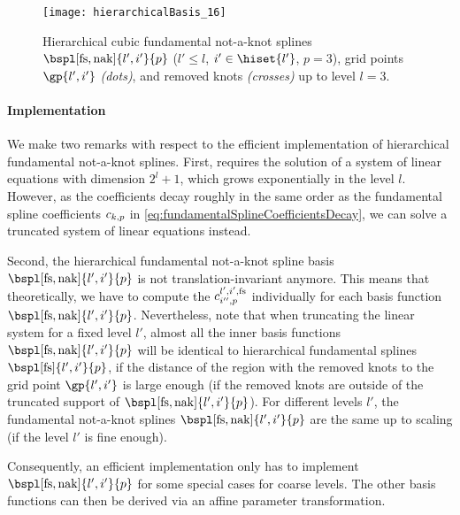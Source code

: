 \begin{SCfigure}
  \texttt{[image: hierarchicalBasis\_16]}%
  \caption[%
    Hierarchical fundamental not-a-knot splines%
  ]{%
    Hierarchical cubic fundamental not-a-knot splines
    $\bspl[\fs,\nak]{l',i'}{p}$
    ($l' \le l$, $i' \in \hiset{l'}$, $p = 3$),
    grid points $\gp{l',i'}$ \emph{(dots)}, and
    removed knots \emph{(crosses)} up to level $l = 3$.%
  }%
  \label{fig:hierarchicalFundamentalNotAKnotSpline}%
\end{SCfigure}

\paragraph{Implementation}

We make two remarks with respect to the efficient implementation
of hierarchical fundamental not-a-knot splines.
First,
 requires the solution of a system
of linear equations with dimension $2^l + 1$,
which grows exponentially in the level $l$.
However, as the coefficients decay roughly in the same order
as the fundamental spline coefficients $\fundsplcoeff{k}{p}$ in
\cref{eq:fundamentalSplineCoefficientsDecay},
we can solve a truncated system of linear equations instead.

Second, the hierarchical fundamental not-a-knot spline basis
$\bspl[\fs,\nak]{l',i'}{p}$ is not translation-invariant anymore.
This means that theoretically, we have to compute the
$\fundsplcoeff[l',i',\fs]{i''}{p}$ individually for each basis function
$\bspl[\fs,\nak]{l',i'}{p}$.
Nevertheless, note that
when truncating the linear system for a fixed level $l'$,
almost all the inner basis functions $\bspl[\fs,\nak]{l',i'}{p}$
will be identical to hierarchical fundamental splines
$\bspl[\fs]{l',i'}{p}$, if the distance of the region with the removed knots
to the grid point $\gp{l',i'}$ is large enough
(if the removed knots are outside of the truncated support of
$\bspl[\fs,\nak]{l',i'}{p}$).
For different levels $l'$, the fundamental not-a-knot splines
$\bspl[\fs,\nak]{l',i'}{p}$ are the same up to scaling
(if the level $l'$ is fine enough).

Consequently, an efficient implementation only has to implement
$\bspl[\fs,\nak]{l',i'}{p}$ for some special cases for coarse levels.
The other basis functions can then be derived via an affine
parameter transformation.
